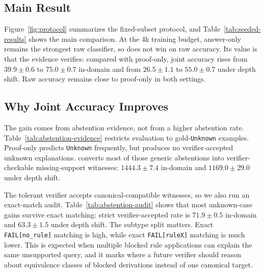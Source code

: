 \subsection{Main Result}

Figure~\ref{fig:protocol} summarizes the fixed-subset protocol, and
Table~\ref{tab:seeded-results} shows the main comparison. At the 4k training
budget, answer-only remains the strongest raw classifier, so \model{} does not
win on raw accuracy. Its value is that the evidence verifies: compared with
proof-only, joint accuracy rises from \(39.9 \pm 0.6\) to \(75.0 \pm 0.7\)
in-domain and from \(26.5 \pm 1.1\) to \(55.0 \pm 0.7\) under depth shift. Raw
accuracy remains close to proof-only in both settings.

\begin{table}[t]
\centering
\small

\caption{Seeded 7B results on a fixed sampled test subset. Verifier-accepted
means the evidence satisfies the paper's tolerant checker; Joint requires a
correct label and verifier-accepted evidence. Answer-only joint is 0 by
construction. Rows report means over 3 seeds.}
\label{tab:seeded-results}
\end{table}

\subsection{Why Joint Accuracy Improves}

The gain comes from abstention evidence, not from a higher abstention rate.
Table~\ref{tab:abstention-evidence} restricts evaluation to gold-\texttt{Unknown}
examples. Proof-only predicts \texttt{Unknown} frequently, but produces no
verifier-accepted unknown explanations. \model{} converts most of those generic
abstentions into verifier-checkable missing-support witnesses: \(1444.3 \pm
7.4\) in-domain and \(1169.0 \pm 29.0\) under depth shift.

\begin{table}[t]
\centering
\small

\caption{Gold-\texttt{Unknown} behavior on the fixed 7B test subset. Verifier-accepted
means the model predicts \texttt{Unknown} and emits an accepted missing-support
witness; generic means it predicts \texttt{Unknown} without accepted evidence.
Rows report 3-seed means.}
\label{tab:abstention-evidence}
\end{table}

The tolerant verifier accepts canonical-compatible witnesses, so we also run an
exact-match audit. Table~\ref{tab:abstention-audit} shows that most
unknown-case gains survive exact matching: strict verifier-accepted rate is \(71.9 \pm
0.5\) in-domain and \(63.3 \pm 1.5\) under depth shift. The subtype split
matters. Exact \texttt{FAIL[no\_rule]} matching is high, while exact
\texttt{FAIL[ruleX]} matching is much lower. This is expected when multiple
blocked rule applications can explain the same unsupported query, and it marks
where a future verifier should reason about equivalence classes of blocked
derivations instead of one canonical target.

